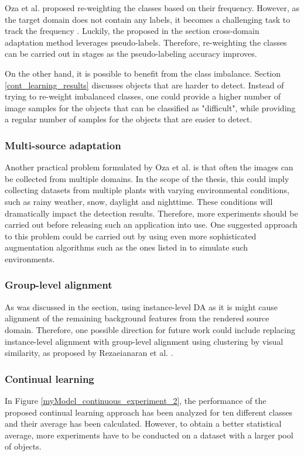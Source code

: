 Oza et al. proposed re-weighting the classes based on their frequency. However, as the target domain does not contain any labels, it becomes a challenging task to track the frequency \cite{Oza2021}. Luckily, the proposed in the  section cross-domain adaptation method leverages pseudo-labels. Therefore, re-weighting the classes can be carried out in stages as the pseudo-labeling accuracy improves. 

On the other hand, it is possible to benefit from the class imbalance. Section \ref{cont_learning_results} discusses objects that are harder to detect. Instead of trying to re-weight imbalanced classes, one could provide a higher number of image samples for the objects that can be classified as "difficult", while providing a regular number of samples for the objects that are easier to detect.

\subsubsection{Multi-source adaptation}
Another practical problem formulated by Oza et al. \cite{Oza2021} is that often the images can be collected from multiple domains. In the scope of the thesis, this could imply collecting datasets from multiple plants with varying environmental conditions, such as rainy weather, snow, daylight and nighttime. These conditions will dramatically impact the detection results. Therefore, more experiments should be carried out before releasing such an application into use. One suggested approach to this problem could be carried out by using even more sophisticated augmentation algorithms such as the ones listed in \cite{imgaug} to simulate such environments. 

\subsubsection{Group-level alignment}
As was discussed in the  section, using instance-level DA as it is might cause alignment of the remaining background features from the rendered source domain. Therefore, one possible direction for future work could include replacing instance-level alignment with group-level alignment using clustering by visual similarity, as proposed by Rezaeianaran et al. \cite{Rezaeianaran2021}. 

\subsubsection{Continual learning}
In Figure \ref{myModel_continuous_experiment_2}, the performance of the proposed continual learning approach has been analyzed for ten different classes and their average has been calculated. However, to obtain a better statistical average, more experiments have to be conducted on a dataset with a larger pool of objects. 

